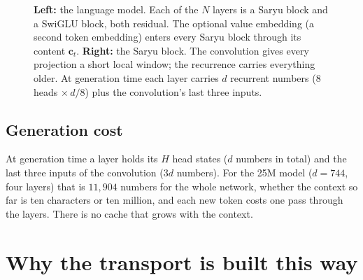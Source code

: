 \documentclass[10pt]{article}
\newcommand{\R}{\mathbb{R}}
\newcommand{\bh}{\mathbf{h}}
\newcommand{\bc}{\mathbf{c}}
\newcommand{\bz}{\mathbf{z}}
\begin{document}
\begin{figure}[t]
\begin{minipage}[b]{0.66\linewidth}
{}
\end{minipage}
\caption{\textbf{Left:} the language model. Each of the $N$ layers is a Saryu block and a SwiGLU block,
both residual. The optional value embedding (a second token embedding) enters every Saryu block through
its content $\bc_t$. \textbf{Right:} the Saryu block. The convolution gives every projection a short local
window; the recurrence carries everything older. At generation time each layer carries $d$ recurrent
numbers ($8$ heads $\times\,d/8$) plus the convolution's last three inputs.}
\label{fig:arch}
\end{figure}

\subsection{Generation cost}

At generation time a layer holds its $H$ head states ($d$ numbers in total) and the last three inputs of
the convolution ($3d$ numbers). For the 25M model ($d=744$, four layers) that is $11{,}904$ numbers for
the whole network, whether the context so far is ten characters or ten million, and each new token costs
one pass through the layers. There is no cache that grows with the context.

\section{Why the transport is built this way}
\label{sec:why}
\end{document}
